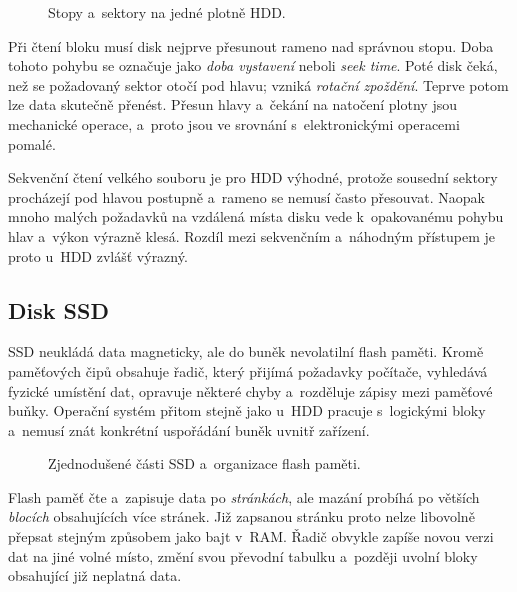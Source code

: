 \begin{figure}[ht]
    \centering
    
    \caption{Stopy a~sektory na jedné plotně HDD.}
    \label{fig:hw-hdd-plotna}
\end{figure}

Při čtení bloku musí disk nejprve přesunout rameno nad správnou stopu. Doba tohoto pohybu se označuje jako \emph{doba vystavení} neboli \emph{seek time}. Poté disk čeká, než se požadovaný sektor otočí pod hlavu; vzniká \emph{rotační zpoždění}. Teprve potom lze data skutečně přenést. Přesun hlavy a~čekání na natočení plotny jsou mechanické operace, a~proto jsou ve srovnání s~elektronickými operacemi pomalé.

Sekvenční čtení velkého souboru je pro HDD výhodné, protože sousední sektory procházejí pod hlavou postupně a~rameno se nemusí často přesouvat. Naopak mnoho malých požadavků na vzdálená místa disku vede k~opakovanému pohybu hlav a~výkon výrazně klesá. Rozdíl mezi sekvenčním a~náhodným přístupem je proto u~HDD zvlášť výrazný.


\subsection{Disk SSD}\label{subsec:hw-ssd}

SSD neukládá data magneticky, ale do buněk nevolatilní flash paměti. Kromě paměťových čipů obsahuje řadič, který přijímá požadavky počítače, vyhledává fyzické umístění dat, opravuje některé chyby a~rozděluje zápisy mezi paměťové buňky. Operační systém přitom stejně jako u~HDD pracuje s~logickými bloky a~nemusí znát konkrétní uspořádání buněk uvnitř zařízení.

\begin{figure}[ht]
    \centering
    
    \caption{Zjednodušené části SSD a~organizace flash paměti.}
    \label{fig:hw-ssd-struktura}
\end{figure}

Flash paměť čte a~zapisuje data po \emph{stránkách}, ale mazání probíhá po větších \emph{blocích} obsahujících více stránek. Již zapsanou stránku proto nelze libovolně přepsat stejným způsobem jako bajt v~RAM. Řadič obvykle zapíše novou verzi dat na jiné volné místo, změní svou převodní tabulku a~později uvolní bloky obsahující již neplatná data.

